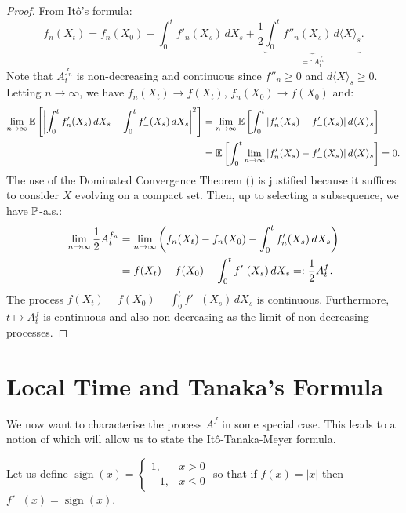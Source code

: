 \begin{proof}
    From Itô's formula:
    \begin{equation*}
        f_n(X_t) = f_n(X_0) + \int_0^t f'_n(X_s) \, dX_s + \frac{1}{2} \underbrace{\int_0^t f''_n(X_s) \, d\langle X \rangle_s}_{=: A^{f_n}_t}.
    \end{equation*}
    Note that $A^{f_n}_t$ is non-decreasing and continuous since $f''_n \geq 0$ and $d\langle X \rangle_s \geq 0$.
    Letting $n \to \infty$, we have $f_n(X_t) \to f(X_t)$, $f_n(X_0) \to f(X_0)$ and:
    \begin{align*}
        \lim_{n \to \infty} \mathbb E \left[ \left| \int_0^t f'_n(X_s) \, dX_s - \int_0^t f'_-(X_s) \, dX_s \right|^2 \right] &= \lim_{n \to \infty} \mathbb E \left[ \int_0^t |f'_n(X_s) - f'_-(X_s)| \, d\langle X \rangle_s \right] \\
        &= \mathbb E \left[ \int_0^t \lim_{n \to \infty} |f'_n(X_s) - f'_-(X_s)| \, d\langle X \rangle_s \right] = 0.
    \end{align*}
    The use of the Dominated Convergence Theorem () is justified because it suffices to consider $X$ evolving on a compact set.
    Then, up to selecting a subsequence, we have $\mathbb P$-a.s.:
    \begin{align*}
        \lim_{n \to \infty} \frac{1}{2} A^{f_n}_t &= \lim_{n \to \infty} \left( f_n(X_t) - f_n(X_0) - \int_0^t f'_n(X_s) \, dX_s \right) \\
        &= f(X_t) - f(X_0) - \int_0^t f'_-(X_s) \, dX_s =: \frac{1}{2} A^f_t.
    \end{align*}
    The process $f(X_t) - f(X_0) - \int_0^t f'_-(X_s) \, dX_s$ is continuous.
    Furthermore, $t \mapsto A^f_t$ is continuous and also non-decreasing as the limit of non-decreasing processes.
\end{proof}

\section{Local Time and Tanaka's Formula}

\begin{remark}
    We now want to characterise the process $A^f$ in some special case. This leads to a notion of  which will allow us to state the Itô-Tanaka-Meyer formula.
    
    Let us define $\operatorname{sign}(x) = \begin{cases} 1, & x > 0 \\ -1, & x \leq 0 \end{cases}$ so that if $f(x) = |x|$ then $f'_-(x) = \operatorname{sign}(x)$.
\end{remark}

